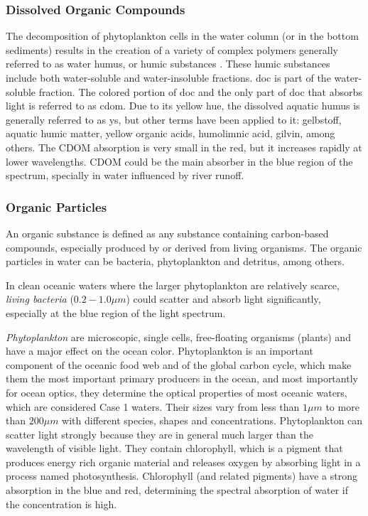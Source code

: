 \subsubsection*{Dissolved Organic Compounds}
The decomposition of phytoplankton cells in the water column (or in the bottom sediments) results in the creation of a variety of complex polymers generally referred to as water humus, or humic substances \citep{Bukata1995}. These humic substances include both water-soluble and water-insoluble fractions. \Gls{doc} is part of the water-soluble fraction.  The colored portion of \gls{doc} and the only part of \gls{doc} that absorbs light is referred to as \acrfull{cdom}. Due to its yellow hue, the dissolved aquatic humus is generally referred to as \gls{ys}, but other terms have been applied to it: gelbstoff, aquatic humic matter, yellow organic acids, humolimnic acid, gilvin, among others. The CDOM absorption is very small in the red, but it increases rapidly at lower wavelengths. CDOM could be the main absorber in the blue region of the spectrum, specially in water influenced by river runoff.
\subsubsection*{Organic Particles}
An organic substance is defined as any substance containing carbon-based compounds, especially produced by or derived from living organisms. The organic particles in water can be bacteria, phytoplankton and detritus, among others.

In clean oceanic waters where the larger phytoplankton are relatively scarce, {\it living bacteria} ($0.2-1.0\mu m$) could scatter and absorb light significantly, especially at the blue region of the light spectrum.

{\it Phytoplankton} are microscopic, single cells, free-floating organisms (plants) and have a major effect on the ocean color. Phytoplankton is an important component of the oceanic food web and of the global carbon cycle, which make them the most important primary producers in the ocean, and most importantly for ocean optics, they determine the optical properties of most oceanic waters, which are considered Case 1 waters. Their sizes vary from less than $1\mu m$ to more than $200\mu m$ with different species, shapes and concentrations. Phytoplankton can scatter light strongly because they are in general much larger than the wavelength of visible light. They contain chlorophyll, which is a pigment that produces energy rich organic material and releases oxygen by absorbing light in a process named photosynthesis. Chlorophyll (and related pigments) have a strong absorption in the blue and red, determining the spectral absorption of water if the concentration is high.


